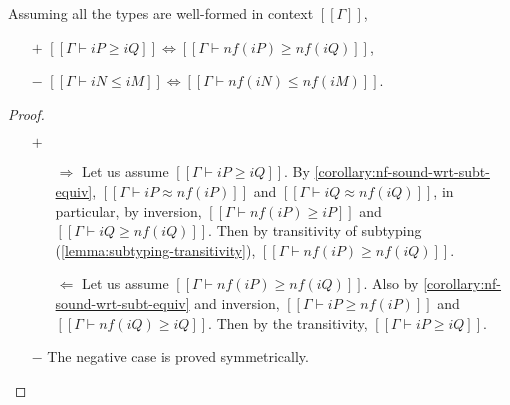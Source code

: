 \begin{corollary} 
  \label{corollary:nf-pres-subt}
  Assuming all the types are well-formed in context $[[Γ]]$,
  \begin{itemize}
    \item [$+$] $[[Γ ⊢ iP ≥ iQ]] \iff [[Γ ⊢ nf(iP) ≥ nf(iQ)]]$,
    \item [$-$] $[[Γ ⊢ iN ≤ iM]] \iff [[Γ ⊢ nf(iN) ≤ nf(iM)]]$.
  \end{itemize}
\end{corollary}
\begin{proof}
  \hfill
  \begin{itemize}
    \item [$+$]  
    \begin{itemize}
      \item [$\Rightarrow$] Let us assume $[[Γ ⊢ iP ≥ iQ]]$.
        By \cref{corollary:nf-sound-wrt-subt-equiv},
        $[[Γ ⊢ iP ≈ nf(iP)]]$ and $[[Γ ⊢ iQ ≈ nf(iQ)]]$, 
        in particular, by inversion, 
        $[[Γ ⊢ nf(iP) ≥ iP]]$ and $[[Γ ⊢ iQ ≥ nf(iQ)]]$.
        Then by transitivity of subtyping 
        (\cref{lemma:subtyping-transitivity}), 
        $[[Γ ⊢ nf(iP) ≥ nf(iQ)]]$.
      \item [$\Leftarrow$] Let us assume $[[Γ ⊢ nf(iP) ≥ nf(iQ)]]$.
        Also by \cref{corollary:nf-sound-wrt-subt-equiv}
        and inversion, 
        $[[Γ ⊢ iP ≥ nf(iP)]]$ and $[[Γ ⊢ nf(iQ) ≥ iQ]]$.
        Then by the transitivity, $[[Γ ⊢ iP ≥ iQ]]$.
    \end{itemize}
    \item [$-$] The negative case is proved symmetrically.
  \end{itemize}
\end{proof}

